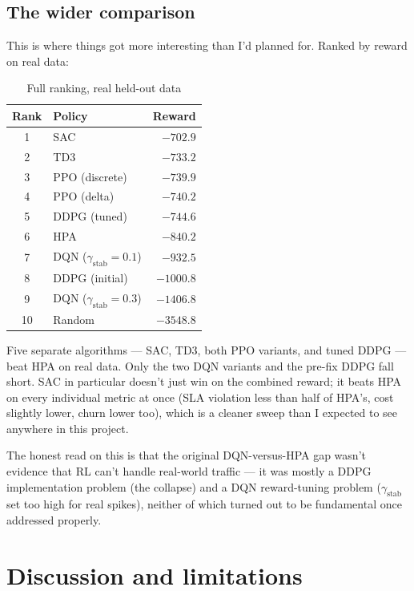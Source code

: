 \documentclass{rapportINPTCLOUD}
\begin{document}
\subsection{The wider comparison}
\label{sec:benchmark}

This is where things got more interesting than I'd planned for. Ranked by reward on real data:

\begin{table}[h]
\centering
\begin{tabular}{clr}
\toprule
\textbf{Rank} & \textbf{Policy} & \textbf{Reward} \\
\midrule
1 & SAC & $-702.9$ \\
2 & TD3 & $-733.2$ \\
3 & PPO (discrete) & $-739.9$ \\
4 & PPO (delta) & $-740.2$ \\
5 & DDPG (tuned) & $-744.6$ \\
6 & HPA & $-840.2$ \\
7 & DQN ($\gamma_{\text{stab}}{=}0.1$) & $-932.5$ \\
8 & DDPG (initial) & $-1000.8$ \\
9 & DQN ($\gamma_{\text{stab}}{=}0.3$) & $-1406.8$ \\
10 & Random & $-3548.8$ \\
\bottomrule
\end{tabular}
\caption{Full ranking, real held-out data}
\end{table}

Five separate algorithms — SAC, TD3, both PPO variants, and tuned DDPG — beat HPA on real data. Only the two DQN variants and the pre-fix DDPG fall short. SAC in particular doesn't just win on the combined reward; it beats HPA on every individual metric at once (SLA violation less than half of HPA's, cost slightly lower, churn lower too), which is a cleaner sweep than I expected to see anywhere in this project.

The honest read on this is that the original DQN-versus-HPA gap wasn't evidence that RL can't handle real-world traffic — it was mostly a DDPG implementation problem (the collapse) and a DQN reward-tuning problem ($\gamma_{\text{stab}}$ set too high for real spikes), neither of which turned out to be fundamental once addressed properly.

\section{Discussion and limitations}
\label{sec:discussion}
\end{document}
